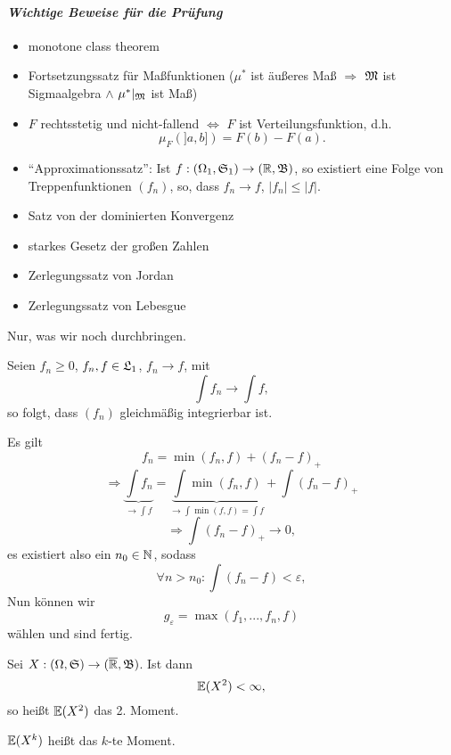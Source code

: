 			\paragraph{\it Wichtige Beweise für die Prüfung}
			\begin{itemize}
				\item monotone class theorem
				\item Fortsetzungssatz für Maßfunktionen ($\mu^*$ ist äußeres Maß $\Rightarrow$ $\mathfrak{M}$ ist Sigmaalgebra $\land$ $\mu^*|_{\mathfrak{M}}$ ist Maß)
				\item $F$ rechtsstetig und nicht-fallend $\Leftrightarrow$ $F$ ist Verteilungsfunktion, d.h.
				\[ \mu_F(]a,b])=F(b)-F(a). \]
				\item "`Approximationssatz"': Ist $f: (\Omega_1,\mathfrak{S}_1)\to(\mathbb{R},\mathfrak{B})$, so existiert eine Folge von Treppenfunktionen $(f_n)$, so, dass $f_n\to f$, $|f_n|\le|f|$. 
				\item Satz von der dominierten Konvergenz
				\item starkes Gesetz der großen Zahlen 
				\item Zerlegungssatz von Jordan
				\item Zerlegungssatz von Lebesgue
			\end{itemize}
			Nur, was wir noch durchbringen. 
			
			\begin{satz}
				Seien $f_n\ge 0$, $f_n,f\in\mathfrak{L}_1$, $f_n\to f$, mit 
				\[ \int f_n\to\int f, \]
				so folgt, dass $(f_n)$ gleichmäßig integrierbar ist.  
			\end{satz}
			
			\begin{bew}
				Es gilt
				\[ f_n=\min(f_n,f)+(f_n-f)_+ \]
				\[ \Rightarrow\underbrace{\int f_n}_{\to \int f}=\underbrace{\int\min(f_n,f)}_{\to\int\min(f,f)=\int f}+\int (f_n-f)_+ \]
				\[ \Rightarrow \int (f_n-f)_+\to 0, \]
				es existiert also ein $n_0\in\mathbb{N}$, sodass
				\[ \forall n>n_0: \int (f_n-f)<\varepsilon, \]
				Nun können wir 
				\[ g_\varepsilon=\max(f_1,...,f_n,f) \]
				wählen und sind fertig. 
			\end{bew}
			
			\begin{defi}
				Sei $X: (\Omega,\mathfrak{S})\to(\overline{\mathbb{R}},\mathfrak{B})$. Ist dann
				\[ \mathbb{E}(X^2)<\infty, \]
				so heißt $\mathbb{E}(X^2)$ das 2. Moment. 
			\end{defi}
			
			\begin{defi}
				$\mathbb{E}(X^k)$ heißt das $k$-te Moment. 
			\end{defi}
			
